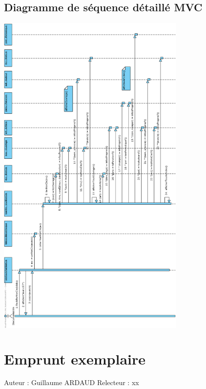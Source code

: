 \documentclass[a4paper,10pt]{report}
\begin{document}
\section*{Diagramme de séquence détaillé MVC}
\bigskip
\includegraphics[height=165mm]{RechParMotCleMVC.png}

\newpage


\chapter*{Emprunt exemplaire}

Auteur : Guillaume ARDAUD
Relecteur : xx
\end{document}
